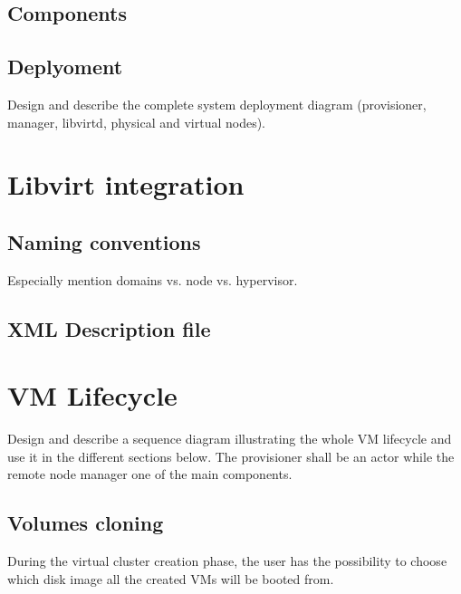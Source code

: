 \subsection{Components}

\subsection{Deplyoment}

\begin{todo}
Design and describe the complete system deployment diagram (provisioner, manager, libvirtd, physical and virtual nodes).
\end{todo}

\section{Libvirt integration}

\subsection{Naming conventions}

\begin{todo}
Especially mention domains vs. node vs. hypervisor.
\end{todo}

\subsection{XML Description file}


\section{VM Lifecycle}

\begin{todo}
Design and describe a sequence diagram illustrating the whole VM lifecycle and use it in the different sections below. The provisioner shall be an actor while the remote node manager one of the main components.
\end{todo}

\subsection{Volumes cloning}

During the virtual cluster creation phase, the user has the possibility to choose which disk image all the created VMs will be booted from.

